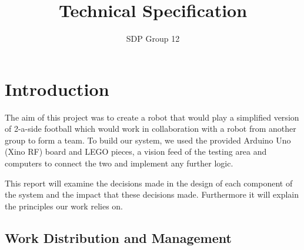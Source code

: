 ﻿\documentclass[12pt,a4paper,titlepage]{article}
\author{SDP Group 12}
\title{Technical Specification}
\begin{document}
\maketitle

\tableofcontents
\clearpage





\section{Introduction}

The aim of this project was to create a robot that would play a simplified version of 2-a-side football which would work in collaboration with a robot from another group to form a team. To build our system, we used the provided Arduino Uno (Xino RF) board and LEGO pieces, a vision feed of the testing area and computers to connect the two and implement any further logic.

This report will examine the decisions made in the design of each component of the system and the impact that these decisions made. Furthermore it will explain the principles our work relies on.

\subsection{Work Distribution and Management}
\end{document}
